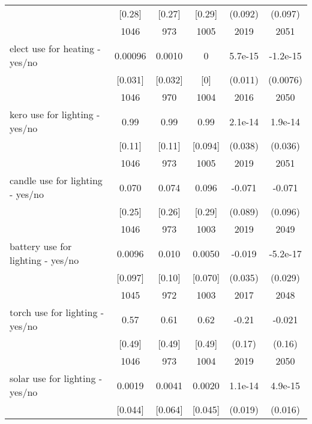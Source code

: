 \begin{table}[htbp]
\begin{tabular*}{0.9\hsize}{@{\hskip\tabcolsep\extracolsep\fill}l*{1}{ccccc}}
                                &   [0.28]&   [0.27]&   [0.29]&  (0.092)         &  (0.097)         \\
                                &     1046&      973&     1005&     2019         &     2051         \\
elect use for heating - yes/no  &  0.00096&   0.0010&        0&  5.7e-15         & -1.2e-15         \\
                                &  [0.031]&  [0.032]&      [0]&  (0.011)         & (0.0076)         \\
                                &     1046&      970&     1004&     2016         &     2050         \\
kero use for lighting  - yes/no &     0.99&     0.99&     0.99&  2.1e-14         &  1.9e-14         \\
                                &   [0.11]&   [0.11]&  [0.094]&  (0.038)         &  (0.036)         \\
                                &     1046&      973&     1005&     2019         &     2051         \\
candle use for lighting  - yes/no&    0.070&    0.074&    0.096&   -0.071         &   -0.071         \\
                                &   [0.25]&   [0.26]&   [0.29]&  (0.089)         &  (0.096)         \\
                                &     1046&      973&     1003&     2019         &     2049         \\
battery use for lighting  - yes/no&   0.0096&    0.010&   0.0050&   -0.019         & -5.2e-17         \\
                                &  [0.097]&   [0.10]&  [0.070]&  (0.035)         &  (0.029)         \\
                                &     1045&      972&     1003&     2017         &     2048         \\
torch use for lighting  - yes/no&     0.57&     0.61&     0.62&    -0.21         &   -0.021         \\
                                &   [0.49]&   [0.49]&   [0.49]&   (0.17)         &   (0.16)         \\
                                &     1046&      973&     1004&     2019         &     2050         \\
solar use for lighting  - yes/no&   0.0019&   0.0041&   0.0020&  1.1e-14         &  4.9e-15         \\
                                &  [0.044]&  [0.064]&  [0.045]&  (0.019)         &  (0.016)         \\

\end{tabular*}
\end{table}
